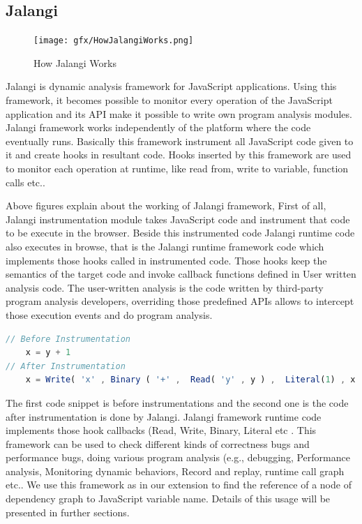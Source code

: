 \subsection{Jalangi}
\begin{figure}[!h]
	\centering
	\texttt{[image: gfx/HowJalangiWorks.png]}
	\caption{How Jalangi Works}
\end{figure}

Jalangi is dynamic analysis framework for JavaScript applications. Using this framework, it becomes possible to monitor every operation of the JavaScript application and its API make it possible to write own program analysis modules. Jalangi framework works independently of the platform where the code eventually runs. Basically this framework instrument all JavaScript code given to it and create hooks in resultant code. Hooks inserted by this framework are used to monitor each operation at runtime, like read from, write to variable, function calls etc.. \citep{Sen:2013:JSR:2491411.2491447}

Above figures explain about the working of Jalangi framework, First of all, Jalangi instrumentation module takes JavaScript code and instrument that code to be execute in the browser. Beside this instrumented code Jalangi runtime code also executes in browse, that is the Jalangi runtime framework code which implements those hooks called in instrumented code. Those hooks keep the semantics of the target code and invoke callback functions defined in User written analysis code. The user-written analysis is the code written by third-party program analysis developers, overriding those predefined APIs allows to intercept those execution events and do program analysis.

\begin{lstlisting}[language=JavaScript, caption=Jalangi Instrumentation]
// Before Instrumentation
	x = y + 1
// After Instrumentation
	x = Write( 'x' , Binary ( '+' ,  Read( 'y' , y ) ,	Literal(1) , x )
\end{lstlisting}

The first code snippet is before instrumentations and the second one is the code after instrumentation is done by Jalangi. Jalangi framework runtime code implements those hook callbacks (Read, Write, Binary, Literal etc .
This framework can be used to check different kinds of correctness bugs and performance bugs, doing various program analysis (e.g., debugging, Performance analysis, Monitoring dynamic behaviors, Record and replay, runtime call graph etc..
We use this framework as in our extension to find the reference of a node of dependency graph to JavaScript variable name. Details of this usage will be presented in further sections.


